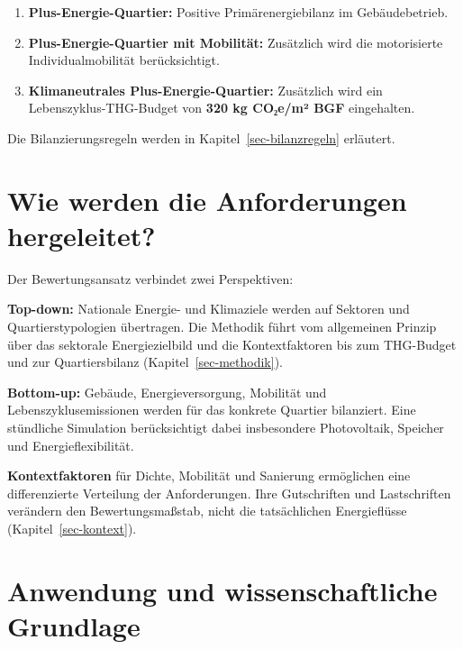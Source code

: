 \documentclass[
  ngerman,
  a4paper,
  DIV=11]{scrreprt}
\providecommand{\tightlist}{%
  \setlength{\itemsep}{0pt}\setlength{\parskip}{0pt}}
\begin{document}
\begin{enumerate}
\def\labelenumi{\arabic{enumi}.}
\tightlist
\item
  \textbf{Plus-Energie-Quartier:} Positive Primärenergiebilanz im
  Gebäudebetrieb.
\item
  \textbf{Plus-Energie-Quartier mit Mobilität:} Zusätzlich wird die
  motorisierte Individualmobilität berücksichtigt.
\item
  \textbf{Klimaneutrales Plus-Energie-Quartier:} Zusätzlich wird ein
  Lebenszyklus-THG-Budget von \textbf{320 kg CO₂e/m² BGF} eingehalten.
\end{enumerate}

Die Bilanzierungsregeln werden in Kapitel~\ref{sec-bilanzregeln}
erläutert.

\section*{Wie werden die Anforderungen
hergeleitet?}\label{wie-werden-die-anforderungen-hergeleitet}


Der Bewertungsansatz verbindet zwei Perspektiven:

\textbf{Top-down:} Nationale Energie- und Klimaziele werden auf Sektoren
und Quartierstypologien übertragen. Die Methodik führt vom allgemeinen
Prinzip über das sektorale Energiezielbild und die Kontextfaktoren bis
zum THG-Budget und zur Quartiersbilanz (Kapitel~\ref{sec-methodik}).

\textbf{Bottom-up:} Gebäude, Energieversorgung, Mobilität und
Lebenszyklusemissionen werden für das konkrete Quartier bilanziert. Eine
stündliche Simulation berücksichtigt dabei insbesondere Photovoltaik,
Speicher und Energieflexibilität.

\textbf{Kontextfaktoren} für Dichte, Mobilität und Sanierung ermöglichen
eine differenzierte Verteilung der Anforderungen. Ihre Gutschriften und
Lastschriften verändern den Bewertungsmaßstab, nicht die tatsächlichen
Energieflüsse (Kapitel~\ref{sec-kontext}).

\section*{Anwendung und wissenschaftliche
Grundlage}\label{anwendung-und-wissenschaftliche-grundlage}
\end{document}
